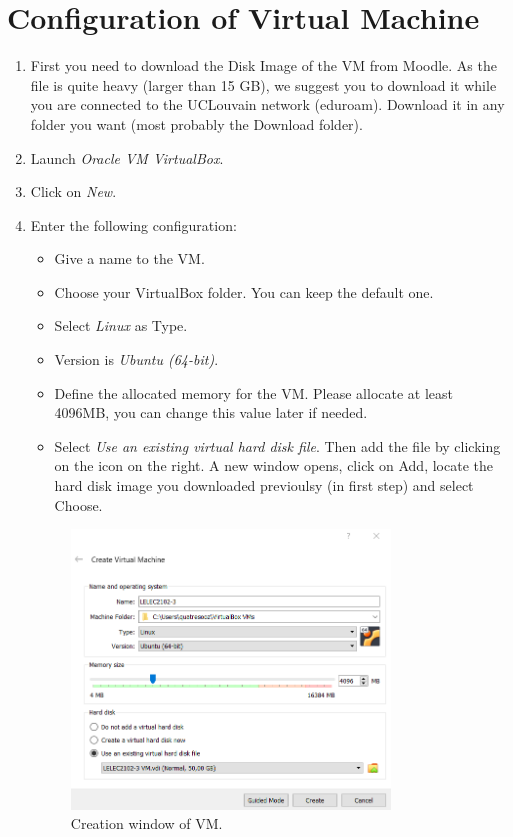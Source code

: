 \documentclass[a4paper,11pt]{article}
\begin{document}
\section{Configuration of Virtual Machine}
\begin{enumerate}
\item First you need to download the Disk Image of the VM from Moodle. As the file is quite heavy (larger than 15 GB), we suggest you to download it while you are connected to the UCLouvain network (eduroam). Download it in any folder you want (most probably the Download folder).
\item Launch \textit{Oracle VM VirtualBox}.
\item Click on \textit{New}.
\item Enter the following configuration:
\begin{itemize}
\item Give a name to the VM.
\item Choose your VirtualBox folder. You can keep the default one.
\item Select \textit{Linux} as Type.
\item Version is \textit{Ubuntu (64-bit)}.
\item Define the allocated memory for the VM. Please allocate at least 4096MB, you can change this value later if needed.
\item Select \textit{Use an existing virtual hard disk file}. Then add the file by clicking on the icon on the right. A new window opens, click on Add, locate the hard disk image you downloaded previoulsy (in first step) and select Choose.
\end{itemize}

\begin{figure}[H]
    \centering
    \includegraphics[width=0.8\textwidth]{figs/Capture2.PNG}
	\caption{Creation window of VM.}
	\label{fig1}
\end{figure}


\end{enumerate}
\end{document}

